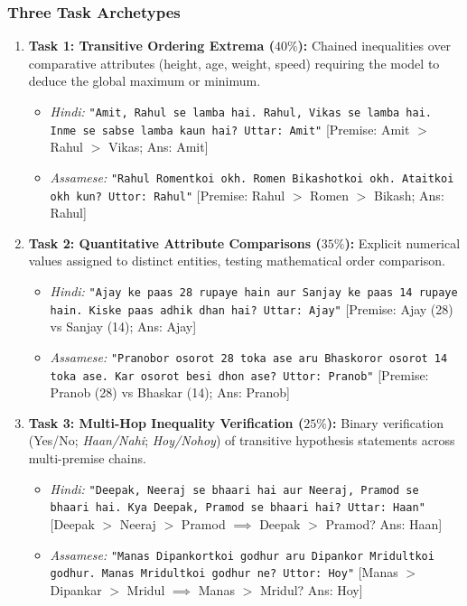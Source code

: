\documentclass[11pt,a4paper]{article}
\begin{document}
\subsubsection{Three Task Archetypes}
\begin{enumerate}[noitemsep]
    \item \textbf{Task 1: Transitive Ordering Extrema ($40\%$):} Chained inequalities over comparative attributes (height, age, weight, speed) requiring the model to deduce the global maximum or minimum.
    \begin{itemize}[noitemsep]
        \item \textit{Hindi:} \texttt{"Amit, Rahul se lamba hai. Rahul, Vikas se lamba hai. Inme se sabse lamba kaun hai? Uttar: Amit"} [Premise: Amit $>$ Rahul $>$ Vikas; Ans: Amit]
        \item \textit{Assamese:} \texttt{"Rahul Romentkoi okh. Romen Bikashotkoi okh. Ataitkoi okh kun? Uttor: Rahul"} [Premise: Rahul $>$ Romen $>$ Bikash; Ans: Rahul]
    \end{itemize}
    \item \textbf{Task 2: Quantitative Attribute Comparisons ($35\%$):} Explicit numerical values assigned to distinct entities, testing mathematical order comparison.
    \begin{itemize}[noitemsep]
        \item \textit{Hindi:} \texttt{"Ajay ke paas 28 rupaye hain aur Sanjay ke paas 14 rupaye hain. Kiske paas adhik dhan hai? Uttar: Ajay"} [Premise: Ajay (28) vs Sanjay (14); Ans: Ajay]
        \item \textit{Assamese:} \texttt{"Pranobor osorot 28 toka ase aru Bhaskoror osorot 14 toka ase. Kar osorot besi dhon ase? Uttor: Pranob"} [Premise: Pranob (28) vs Bhaskar (14); Ans: Pranob]
    \end{itemize}
    \item \textbf{Task 3: Multi-Hop Inequality Verification ($25\%$):} Binary verification (Yes/No; \textit{Haan/Nahi}; \textit{Hoy/Nohoy}) of transitive hypothesis statements across multi-premise chains.
    \begin{itemize}[noitemsep]
        \item \textit{Hindi:} \texttt{"Deepak, Neeraj se bhaari hai aur Neeraj, Pramod se bhaari hai. Kya Deepak, Pramod se bhaari hai? Uttar: Haan"} [Deepak $>$ Neeraj $>$ Pramod $\implies$ Deepak $>$ Pramod? Ans: Haan]
        \item \textit{Assamese:} \texttt{"Manas Dipankortkoi godhur aru Dipankor Mridultkoi godhur. Manas Mridultkoi godhur ne? Uttor: Hoy"} [Manas $>$ Dipankar $>$ Mridul $\implies$ Manas $>$ Mridul? Ans: Hoy]
    \end{itemize}
\end{enumerate}
\end{document}
